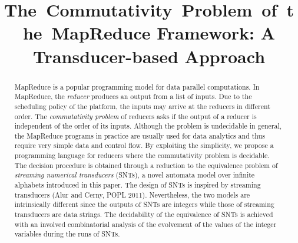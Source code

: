 \documentclass[runningheads,a4paper]{llncs}
\title{The~Commutativity~Problem~of~the~MapReduce Framework: A Transducer-based Approach}
\author{}
\institute{}
\begin{document}
\maketitle

\begin{abstract}

MapReduce is a popular programming model for data parallel computations. 
In MapReduce, the \emph{reducer} produces an output from a list of inputs. Due to the scheduling policy of the platform, the inputs may arrive at the reducers in different order. The \emph{commutativity problem} of reducers asks if the output of a reducer is independent of the order of its inputs. Although the problem is undecidable in general,
the MapReduce programs in practice are usually used for data analytics and thus require very simple data and control flow. 
By exploiting the simplicity, we propose a programming language for reducers where the commutativity problem is decidable.
The decision procedure is obtained through a reduction to the equivalence problem of \emph{streaming numerical transducers} (SNTs), a novel automata model over infinite alphabets introduced in this paper. The design of SNTs is inspired by streaming transducers (Alur and Cerny, POPL 2011). Nevertheless, the two models are intrinsically different since the outputs of SNTs are integers while those of streaming transducers are data strings. 
The decidability of the equivalence of SNTs is achieved with an involved combinatorial analysis of the evolvement of the values of the integer variables during the runs of SNTs.
\end{abstract}



















\newpage


\end{document}
